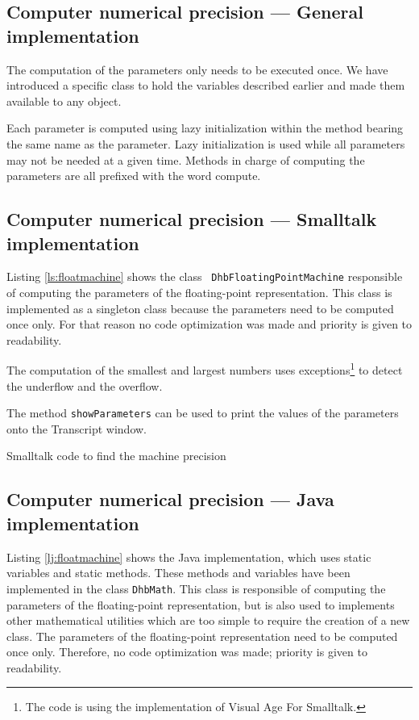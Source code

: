 \documentclass[twoside]{book}
\begin{document}
\subsection{Computer numerical precision --- General implementation}
The computation of the parameters only needs to be executed once.
We have introduced a specific class to hold the variables
described earlier and made them available to any object.

Each parameter is computed using lazy initialization within the
method bearing the same name as the parameter. Lazy initialization
is used while all parameters may not be needed at a given time.
Methods in charge of computing the parameters are all prefixed
with the word compute.

\subsection{Computer numerical precision --- Smalltalk implementation}
Listing \ref{ls:floatmachine} shows the class {\tt
DhbFloatingPointMachine} responsible of computing the parameters
of the floating-point representation. This class is implemented as
a singleton class because the parameters need to be computed once
only. For that reason no code optimization was made and priority
is given to readability.

\noindent The computation of the smallest and largest numbers uses
exceptions\footnote{The code is using the implementation of Visual
Age For Smalltalk\tm.} to detect the underflow and the overflow.

\noindent The method {\tt showParameters} can be used to print the
values of the parameters onto the Transcript window.

\begin{listing} Smalltalk code to find the machine precision
  \label{ls:floatmachine}
  
\end{listing}

\subsection{Computer numerical precision --- Java implementation}
Listing \ref{lj:floatmachine} shows the Java implementation, which
uses static variables and static methods. These methods and
variables have been implemented in the class {\tt DhbMath}. This
class is responsible of computing the parameters of the
floating-point representation, but is also used to implements
other mathematical utilities which are too simple to require the
creation of a new class. The parameters of the floating-point
representation need to be computed once only. Therefore, no code
optimization was made; priority is given to readability.
\end{document}
